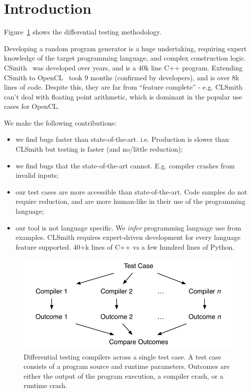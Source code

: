 \section{Introduction}\label{sec:intro}

Figure~\ref{fig:difftest} shows the differential testing methodology.

Developing a random program generator is a huge undertaking, requiring expert knowledge of the target programming language, and complex construction logic. CSmith~\cite{Yang2011} was developed over years, and is a 40k line C++ program. Extending CSmith to OpenCL~\cite{Lidbury2015a} took 9 months (confirmed by developers), and is over 8k lines of code. Despite this, they are far from ``feature complete'' - e.g. CLSmith can't deal with floating point arithmetic, which is dominant in the popular use cases for OpenCL.


We make the following contributions:
%
\begin{itemize}
\item we find bugs faster than state-of-the-art. i.e. Production is slower than CLSmith but testing is faster (and no/little reduction);
\item we find bugs that the state-of-the-art cannot. E.g. compiler crashes from invalid inputs;
\item our test cases are more accessible than state-of-the-art. Code samples do not require reduction, and are more human-like in their use of the programming language;
\item our tool is not language specific. We \emph{infer} programming language use from examples. CLSmith requires expert-driven development for every language feature supported. 40+k lines of C++ vs a few hundred lines of Python.
\end{itemize}

\begin{figure}
  \centering
  \includegraphics[width=.9\columnwidth]{img/difftest} %
  \caption{%
    Differential testing compilers across a single test case. A test case consists of a program source and runtime parameters. Outcomes are either the output of the program execution, a compiler crash, or a runtime crash.%
  }%
  \label{fig:difftest}
\end{figure}